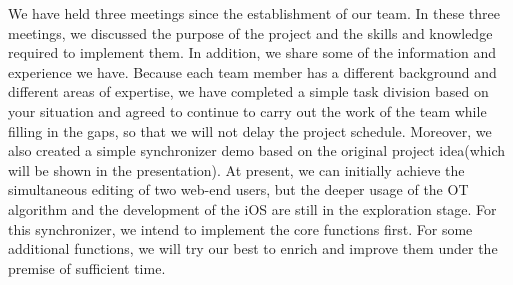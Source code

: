 \noindent We have held three meetings since the establishment of our team. In these three meetings, we discussed the purpose of the project and the skills and knowledge required to implement them. In addition, we share some of the information and experience we have. Because each team member has a different background and different areas of expertise, we have completed a simple task division based on your situation and agreed to continue to carry out the work of the team while filling in the gaps, so that we will not delay the project schedule. Moreover, we also created a simple synchronizer demo based on the original project idea(which will be shown in the presentation). At present, we can initially achieve the simultaneous editing of two web-end users, but the deeper usage of the OT algorithm and the development of the iOS are still in the exploration stage. For this synchronizer, we intend to implement the core functions first. For some additional functions, we will try our best to enrich and improve them under the premise of sufficient time.

